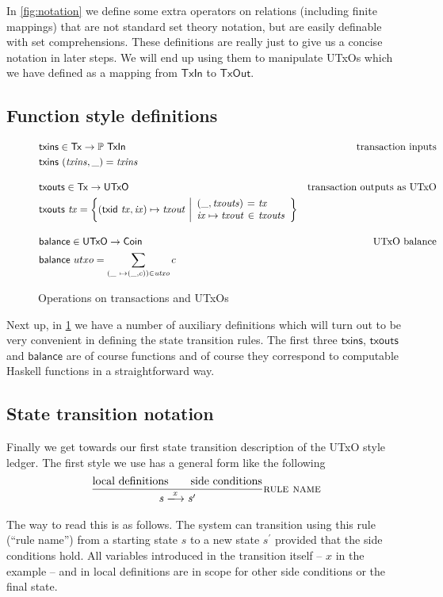 \documentclass[11pt,a4paper]{article}
\newcommand{\powerset}[1]{\mathbb{P}~#1}
\newcommand{\var}[1]{\mathit{#1}}
\newcommand{\fun}[1]{\mathsf{#1}}
\newcommand{\type}[1]{\mathsf{#1}}
\newcommand{\transitionarrow}[2]{\xlongrightarrow[\textsc{#1}]{#2}}
\begin{document}
In \cref{fig:notation} we define some extra operators on relations (including
finite mappings) that are not standard set theory notation, but are easily
definable with set comprehensions. These definitions are really just to give us
a concise notation in later steps. We will end up using them to manipulate
UTxOs which we have defined as a mapping from $\type{TxIn}$ to $\type{TxOut}$.

\subsection{Function style definitions}

\begin{figure}
\begin{align*}
& \fun{txins} \in \type{Tx} \to \powerset{\type{TxIn}}
& \text{transaction inputs} \\
& \fun{txins} ~ (\var{txins}, \_) = \var{txins}
\\[1em]
& \fun{txouts} \in \type{Tx} \to \type{UTxO}
& \text{transaction outputs as UTxO} \\
& \fun{txouts} ~ \var{tx} =
  \left\{ (\fun{txid} ~ \var{tx}, \var{ix}) \mapsto \var{txout} ~
  \middle| \begin{array}{l@{~}c@{~}l}
             (\_, \var{txouts}) & = & \var{tx} \\
             \var{ix} \mapsto \var{txout} & \in & \var{txouts}
           \end{array}
  \right\}
\\[1em]
& \fun{balance} \in \type{UTxO} \to \type{Coin}
& \text{UTxO balance} \\
& \fun{balance} ~ utxo = \sum_{(\_ ~ \mapsto (\_, c)) \in \var{utxo}} c
\end{align*}
\caption{Operations on transactions and UTxOs}
\label{fig:auxiliary_ops}
\end{figure}


Next up, in \cref{fig:auxiliary_ops} we have a number of auxiliary definitions
which will turn out to be very convenient in defining the state transition
rules. The first three $\fun{txins}$, $\fun{txouts}$ and $\fun{balance}$ are
of course functions and of course they correspond to computable Haskell
functions in a straightforward way.

\subsection{State transition notation}

Finally we get towards our first state transition description of the UTxO style
ledger. The first style we use has a general form like the following
%
\begin{equation*}
\frac{
  \text{local definitions} \qquad  \text{side conditions}
}{
  \var{s}
  \transitionarrow{}{\var{x}}
  \var{s}^\prime
}
\textsc{rule name}
\end{equation*}
%
The way to read this is as follows. The system can transition using this rule
(``rule name'') from a starting state $s$ to a new state $s^\prime$ provided
that the side conditions hold. All variables introduced in the transition
itself -- $x$ in the example -- and in local definitions are in scope for
other side conditions or the final state.
\end{document}
